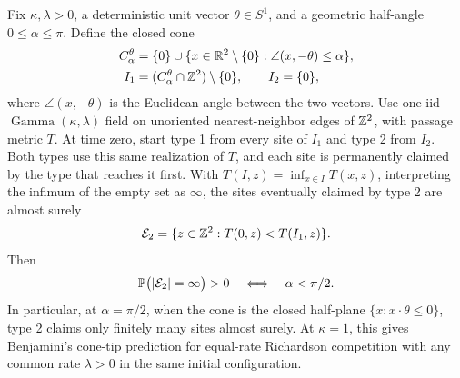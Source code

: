 \begin{corollary}
\label{cor:gamma-cone-tip}
Fix $\kappa,\lambda>0$, a deterministic unit vector $\theta\in S^1$,
and a geometric half-angle $0\le\alpha\le\pi$. Define the closed cone
\[
 \begin{aligned}
 C^\theta_\alpha&=\{0\}\cup
 \{x\in\mathbb R^2\setminus\{0\}:\angle(x,-\theta)\le\alpha\},\\
 I_1&=(C^\theta_\alpha\cap\mathbb Z^2)\setminus\{0\},
 \qquad I_2=\{0\},
 \end{aligned}
\]
where $\angle(x,-\theta)$ is the Euclidean angle between the two vectors.
Use one iid $\operatorname{Gamma}(\kappa,\lambda)$ field on unoriented
nearest-neighbor edges of $\mathbb Z^2$, with passage metric $T$. At time zero,
start type 1 from every site of $I_1$ and type 2 from $I_2$.
Both types use this same realization of $T$, and each site is permanently
claimed by the type that reaches it first. With
$T(I,z)=\inf_{x\in I}T(x,z)$, interpreting the infimum of the empty set
as $\infty$, the sites eventually claimed by type 2 are almost surely
\[
 \mathcal E_2=\{z\in\mathbb Z^2:T(0,z)<T(I_1,z)\}.
\]
Then
\[
 \mathbb P\bigl(|\mathcal E_2|=\infty\bigr)>0
 \quad\Longleftrightarrow\quad
 \alpha<\pi/2.
\]
In particular, at $\alpha=\pi/2$, when the cone is the closed half-plane
$\{x:x\cdot\theta\le0\}$, type 2 claims only finitely many sites almost
surely. At $\kappa=1$, this gives Benjamini's cone-tip prediction for
equal-rate Richardson competition with any common rate $\lambda>0$ in
the same initial configuration.
\end{corollary}

